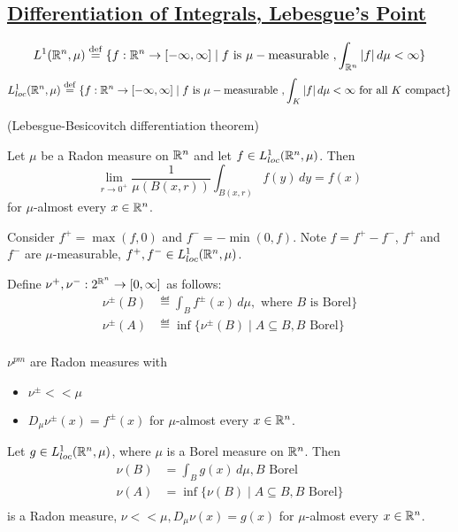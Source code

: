 \documentclass[x11names,reqno,14pt]{extarticle}
\newcommand{\Dmn}{D_\mu\nu}
\newcommand{\loc}{loc}
\begin{document}
\subsection*{\underline{Differentiation of Integrals, Lebesgue's Point}}


\[
L^1(\mathbb{R}^n,\mu) \overset{\mathrm{def}}{=} \{f:\mathbb{R}^n\to[-\infty,\infty] \mid f\text{ is }\mu-\text{measurable }, \int_{\mathbb{R}^n}|f|\,d\mu < \infty\}
\]
\[
L^1_{\loc}(\R^n, \mu) \eqdef \{f:\R^n\to[-\oo,\oo] \mid f\text{ is } \mu-\text{measurable }, \int_K|f|\,d\mu < \oo\text{ for all $K$ compact}\}
\]

\thm (Lebesgue-Besicovitch differentiation theorem)

Let $\mu$ be a Radon measure on $\mathbb{R}^n$ and let $f\in L^1_{\loc}(\R^n, \mu)$. Then 
\[
\lim_{r\to0^+}\frac{1}{\mu(B(x, r))}\int_{B(x, r)}f(y)\,dy = f(x)
\]
for $\mu$-almost every $x \in \mathbb{R}^n$.

\proof

Consider $f^+ = \max(f, 0)$ and $f^- = -\min(0, f)$. Note $f = f^+ - f^-$, $f^+$ and $f^-$ are $\mu$-measurable, $f^+, f^- \in L^1_{\loc}(\R^n,\mu)$. 

Define $\nu^+,\nu^-:2^{\mathbb{R}^n}\to[0,\infty]$ as follows: 
\begin{align*}
\nu^{\pm}(B) & \eqdef \int_Bf^{\pm}(x)\,d\mu, \text{ where $B$ is Borel}\} \\
\nu^{\pm}(A) & \eqdef \inf\{\nu^{\pm}(B) \mid A \subseteq B, B\text{ Borel}\} \\
\end{align*}

\lem 

$\nu^{pm}$ are Radon measures with 
\begin{itemize}

\item $\nu^{\pm} << \mu$
\item $\Dmn^{\pm}(x) = f^{\pm}(x)$ for $\mu$-almost every $x \in \mathbb{R}^n$.

\end{itemize}

\lem Let $g \in L^1_{\loc}(\R^n,\mu)$, where $\mu$ is a Borel measure on $\mathbb{R}^n$. Then
\begin{align*}
\nu(B) & = \int_Bg(x)\,d\mu, B\text{ Borel} \\
\nu(A) & = \inf\{\nu(B)\mid A \subseteq B, B \text{ Borel} \}\\
\end{align*}
is a Radon measure, $\nu<<\mu, \Dmn(x) = g(x)$ for $\mu$-almost every $x\in\mathbb{R}^n$. 
\end{document}
